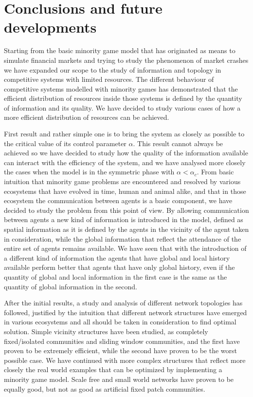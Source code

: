 \chapter{Conclusions and future developments}
\label{chapter:conclusions}

Starting from the basic minority game model that has originated as means to simulate financial markets and trying to study the phenomenon of market crashes we have expanded our scope to the study of information and topology in competitive systems with limited resources.
The different behaviour of competitive systems modelled with minority games has demonstrated that the efficient distribution of resources inside those systems is defined by the quantity of information and its quality.
We have decided to study various cases of how a more efficient distribution of resources can be achieved.

First result and rather simple one is to bring the system as closely as possible to the critical value of its control parameter $\alpha$.
This result cannot always be achieved so we have decided to study how the quality of the information available can interact with the efficiency of the system, and we have analysed more closely the cases when the model is in the symmetric phase with $\alpha<\alpha_c$.
From basic intuition that minority game problems are encountered and resolved by various ecosystems that have evolved in time, human and animal alike, and that in those ecosystem the communication between agents is a basic component, we have decided to study the problem from this point of view.
By allowing communication between agents a new kind of information is introduced in the model, defined as spatial information as it is defined by the agents in the vicinity of the agent taken in consideration, while the global information that reflect the attendance of the entire set of agents remains available.
We have seen that with the introduction of a different kind of information the agents that have global and local history available perform better that agents that have only global history, even if the quantity of global and local information in the first case is the same as the quantity of global information in the second.

After the initial results, a study and analysis of different network topologies has followed, justified by the intuition that different network structures have emerged in various ecosystems and all should be taken in consideration to find optimal solution.
Simple vicinity structures have been studied, as completely fixed/isolated communities and sliding window communities, and the first have proven to be extremely efficient, while the second have proven to be the worst possible case.
We have continued with more complex structures that reflect more closely the real world examples that can be optimized by implementing a minority game model.
Scale free and small world networks have proven to be equally good, but not as good as artificial fixed patch communities.

